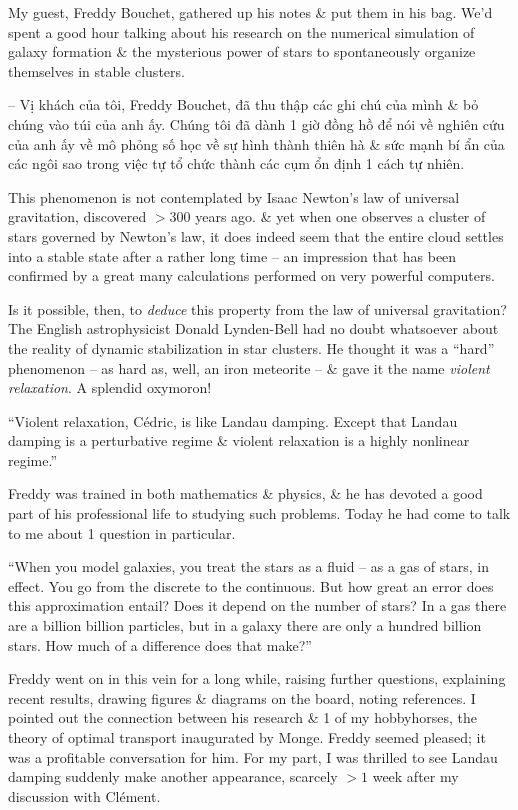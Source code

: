 \documentclass{article}
\begin{document}
\begin{enumerate}
	My guest, {\sc Freddy Bouchet}, gathered up his notes \& put them in his bag. We'd spent a good hour talking about his research on the numerical simulation of galaxy formation \& the mysterious power of stars to spontaneously organize themselves in stable clusters.

	-- Vị khách của tôi, {\sc Freddy Bouchet}, đã thu thập các ghi chú của mình \& bỏ chúng vào túi của anh ấy. Chúng tôi đã dành 1 giờ đồng hồ để nói về nghiên cứu của anh ấy về mô phỏng số học về sự hình thành thiên hà \& sức mạnh bí ẩn của các ngôi sao trong việc tự tổ chức thành các cụm ổn định 1 cách tự nhiên.

	This phenomenon is not contemplated by {\sc Isaac Newton}'s law of universal gravitation, discovered $> 300$ years ago. \& yet when one observes a cluster of stars governed by {\sc Newton}'s law, it does indeed seem that the entire cloud settles into a stable state after a rather long time -- an impression that has been confirmed by a great many calculations performed on very powerful computers.

	Is it possible, then, to {\it deduce} this property from the law of universal gravitation? The English astrophysicist {\sc Donald Lynden-Bell} had no doubt whatsoever about the reality of dynamic stabilization in star clusters. He thought it was a ``hard'' phenomenon -- as hard as, well, an iron meteorite -- \& gave it the name {\it violent relaxation}. A splendid oxymoron!

	``Violent relaxation, C\'edric, is like Landau damping. Except that Landau damping is a perturbative regime \& violent relaxation is a highly nonlinear regime.''

	{\sc Freddy} was trained in both mathematics \& physics, \& he has devoted a good part of his professional life to studying such problems. Today he had come to talk to me about 1 question in particular.

	``When you model galaxies, you treat the stars as a fluid -- as a gas of stars, in effect. You go from the discrete to the continuous. But how great an error does this approximation entail? Does it depend on the number of stars? In a gas there are a billion billion particles, but in a galaxy there are only a hundred billion stars. How much of a difference does that make?''

	{\sc Freddy} went on in this vein for a long while, raising further questions, explaining recent results, drawing figures \& diagrams on the board, noting references. I pointed out the connection between his research \& 1 of my hobbyhorses, the theory of optimal transport inaugurated by {\sc Monge}. {\sc Freddy} seemed pleased; it was a profitable conversation for him. For my part, I was thrilled to see Landau damping suddenly make another appearance, scarcely $> 1$ week after my discussion with Cl\'ement.


\end{enumerate}
\end{document}
